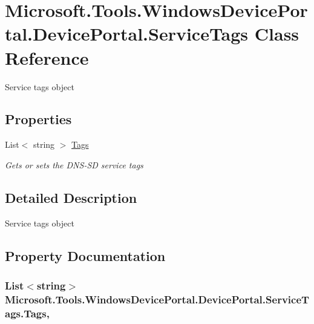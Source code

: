 \hypertarget{class_microsoft_1_1_tools_1_1_windows_device_portal_1_1_device_portal_1_1_service_tags}{}\section{Microsoft.\+Tools.\+Windows\+Device\+Portal.\+Device\+Portal.\+Service\+Tags Class Reference}
\label{class_microsoft_1_1_tools_1_1_windows_device_portal_1_1_device_portal_1_1_service_tags}


Service tags object  


\subsection*{Properties}
\begin{DoxyCompactItemize}
\item 
List$<$ string $>$ \hyperlink{class_microsoft_1_1_tools_1_1_windows_device_portal_1_1_device_portal_1_1_service_tags_ac61e228b4366f17b094d216b12c38f91}{Tags}
\begin{DoxyCompactList}\small\item\em Gets or sets the D\+N\+S-\/\+SD service tags \end{DoxyCompactList}\end{DoxyCompactItemize}


\subsection{Detailed Description}
Service tags object 



\subsection{Property Documentation}
\subsubsection[{\texorpdfstring{Tags}{Tags}}]{\setlength{\rightskip}{0pt plus 5cm}List$<$string$>$ Microsoft.\+Tools.\+Windows\+Device\+Portal.\+Device\+Portal.\+Service\+Tags.\+Tags\hspace{0.3cm}{\ttfamily [get]}, {\ttfamily [set]}}\hypertarget{class_microsoft_1_1_tools_1_1_windows_device_portal_1_1_device_portal_1_1_service_tags_ac61e228b4366f17b094d216b12c38f91}{}\label{class_microsoft_1_1_tools_1_1_windows_device_portal_1_1_device_portal_1_1_service_tags_ac61e228b4366f17b094d216b12c38f91}


